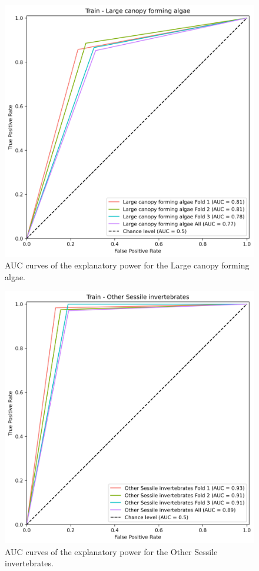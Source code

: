 \begin{figure}
\hypertarget{fig:chap3figS15}{%
\centering
\includegraphics{03-Chapitre3/figures/supplementary/03-receiver_operator_curve_train_rf_Large canopy forming algae.png}
\caption{AUC curves of the explanatory power for the Large canopy
forming algae.}\label{fig:chap3figS15}
}
\end{figure}

\begin{figure}
\hypertarget{fig:chap3figS16}{%
\centering
\includegraphics{03-Chapitre3/figures/supplementary/03-receiver_operator_curve_train_rf_Other Sessile invertebrates.png}
\caption{AUC curves of the explanatory power for the Other Sessile
invertebrates.}\label{fig:chap3figS16}
}
\end{figure}

